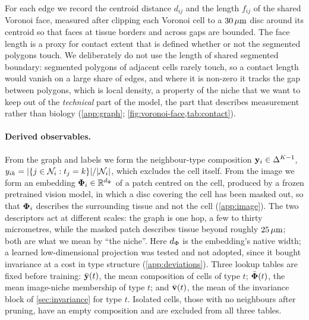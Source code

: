  For each edge we record the centroid distance $d_{ij}$ and the length $f_{ij}$ of the shared Voronoi face, measured after clipping each Voronoi cell to a $30\,\mu\text{m}$ disc around its centroid so that faces at tissue borders and across gaps are bounded. The face length is a proxy for contact extent that is defined whether or not the segmented polygons touch. We deliberately do not use the length of shared segmented boundary: segmented polygons of adjacent cells rarely touch, so a contact length would vanish on a large share of edges, and where it is non-zero it tracks the gap between polygons, which is local density, a property of the niche that we want to keep out of the \emph{technical} part of the model, the part that describes measurement rather than biology (\cref{app:graph}; \cref{fig:voronoi-face,tab:contact}).

\paragraph{Derived observables.}
 From the graph and labels we form the neighbour-type composition $\mathbf{y}_i \in \Delta^{K-1}$, $y_{ik} = |\{j \in \mathcal{N}_{i} : t_j = k\}| / |\mathcal{N}_{i}|$, which excludes the cell itself. From the image we form an embedding $\boldsymbol{\Phi}_i \in \mathbb{R}^{d_{\Phi}}$ of a patch centred on the cell, produced by a frozen pretrained vision model, in which a disc covering the cell has been masked out, so that $\boldsymbol{\Phi}_i$ describes the surrounding tissue and not the cell (\cref{app:image}). The two descriptors act at different scales: the graph is one hop, a few to thirty micrometres, while the masked patch describes tissue beyond roughly $25\,\mu\text{m}$; both are what we mean by ``the niche''. Here $d_{\Phi}$ is the embedding's native width; a learned low-dimensional projection was tested and not adopted, since it bought invariance at a cost in type structure (\cref{app:deviations}). Three lookup tables are fixed before training: $\bar{\mathbf{y}}(t)$, the mean composition of cells of type $t$; $\bar{\boldsymbol{\Phi}}(t)$, the mean image-niche membership of type $t$; and $\bar{\mathbf{v}}(t)$, the mean of the invariance block of \cref{sec:invariance} for type $t$. Isolated cells, those with no neighbours after pruning, have an empty composition and are excluded from all three tables.


